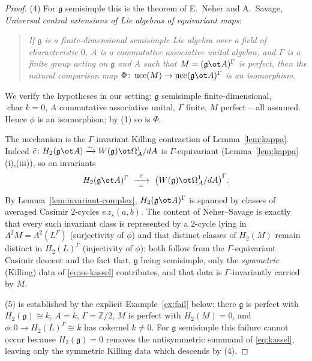 \documentclass{amsart}
\theoremstyle{definition}
\DeclareMathOperator{\uce}{uce}
\newcommand{\g}{\mathfrak{g}}
\newcommand{\Om}{\Omega}
\newcommand{\Gm}{\Gamma}
\newcommand{\ra}{\rightarrow}
\begin{document}
\begin{proof}
\smallskip
(4) For $\g$ semisimple this is the theorem of E.~Neher and A.~Savage,
\emph{Universal central extensions of Lie algebras of equivariant maps}:
\begin{quote}
\emph{If $\g$ is a finite-dimensional semisimple Lie algebra over a field of
characteristic $0$, $A$ is a commutative associative unital algebra, and $\Gm$ is a
finite group acting on $\g$ and $A$ such that $M=(\g\ot A)^{\Gm}$ is perfect, then
the natural comparison map $\Phi\colon\uce(M)\ra\uce(\g\ot A)^{\Gm}$ is an
isomorphism.}
\end{quote}
We verify the hypotheses in our setting: $\g$ semisimple finite-dimensional,
$\operatorname{char}k=0$, $A$ commutative associative unital, $\Gm$ finite, $M$
perfect -- all assumed.  Hence $\phi$ is an isomorphism; by (1) so is $\Phi$.

The mechanism is the $\Gm$-invariant Killing contraction of Lemma~\ref{lem:kappa}.
Indeed $\bar c\colon H_2(\g\ot A)\xrightarrow{\sim}W(\g)\ot\Om^1_A/dA$ is
$\Gm$-equivariant (Lemma~\ref{lem:kappa}(i),(iii)), so on invariants
\[
   H_2(\g\ot A)^{\Gm}\ \xrightarrow[\ \sim\ ]{\bar c}\ \bigl(W(\g)\ot\Om^1_A/dA\bigr)^{\Gm}.
\]
By Lemma~\ref{lem:invariant-complex}, $H_2(\g\ot A)^{\Gm}$ is spanned by classes of
averaged Casimir $2$-cycles $e\,z_s(a,b)$.  The content of Neher--Savage is exactly
that every such invariant class is represented by a $2$-cycle lying in
$\Lambda^2M=\Lambda^2(L^{\Gm})$ (surjectivity of $\phi$) and that distinct classes
of $H_2(M)$ remain distinct in $H_2(L)^{\Gm}$ (injectivity of $\phi$); both follow
from the $\Gm$-equivariant Casimir descent and the fact that, $\g$ being
semisimple, only the \emph{symmetric} (Killing) data of \eqref{eq:ss-kassel}
contributes, and that data is $\Gm$-invariantly carried by $M$.

\smallskip
(5) is established by the explicit Example~\ref{ex:fail} below: there $\g$ is
perfect with $H_2(\g)\cong k$, $A=k$, $\Gm=\mathbb Z/2$, $M$ is perfect with
$H_2(M)=0$, and $\phi\colon0\ra H_2(L)^{\Gm}\cong k$ has cokernel $k\ne0$.
For $\g$ semisimple this failure cannot occur because $H_2(\g)=0$ removes the
antisymmetric summand of \eqref{eq:kassel}, leaving only the symmetric Killing
data which descends by (4).
\end{proof}
\end{document}

